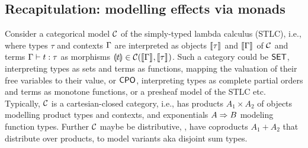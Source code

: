 \documentclass[acmsmall,review,anonymous]{acmart}\settopmatter{printfolios=true,printccs=false,printacmref=false}
\newcommand{\graybox}[1]{\grayboxtext{$#1$}}
\begin{document}
\newcommand{\SubstTy}[4]{#1#2 \vdash #3 : #4}
\newcommand{\pSubstTy}[4]{(#1)#2 \vdash (#3) : (#4)}
\newcommand{\ValTy}[3]{#1 \vdash #2 : #3}
\newcommand{\oCompTy}{\ValTy}
\newcommand{\CompTy}[4]{#1 \vdash #2 : #4 \mid #3}
\newcommand{\gpValTy}[4]{\graybox{(#1)}#2 \vdash #3 : #4}
\newcommand{\gqValTy}[4]{\graybox{#1}#2 \vdash #3 : #4}
\newcommand{\gpCompTy}[4]{\graybox{(#1)}#2 \vdash #3 : #4}
\newcommand{\gqCompTy}[4]{\graybox{#1}#2 \vdash #3 : #4}
\newcommand{\pValTy}[4]{(#1)#2 \vdash #3 : #4}
\newcommand{\qValTy}[4]{#1#2 \vdash #3 : #4}
\newcommand{\pCompTy}[4]{(#1)#2 \vdash #3 : #4}
\newcommand{\qCompTy}[4]{#1#2 \vdash #3 : #4}
\newcommand{\ru}{\dfrac}
\newcommand{\nru}[3]{#1\;\dfrac{#2}{#3}}
\newcommand{\nrux}[4]{#1\;\dfrac{#2}{#3}\;#4}

\newcommand{\rulename}[1]{\ensuremath{\mbox{\textsc{#1}}}\xspace}
\newcommand{\rbeta}[1]{\ensuremath{\beta\mbox{-}\mathord{#1}}\xspace}
\newcommand{\reta}[1]{\ensuremath{\eta\mbox{-}\mathord{#1}}\xspace}
\newcommand{\rpi}[1]{\ensuremath{\pi\mbox{-}\mathord{#1}}\xspace}
\newcommand{\rintro}[1]{\ensuremath{\mathord{#1}\mbox{-\rulename{intro}}}\xspace}
\newcommand{\relim}[1]{\ensuremath{\mathord{#1}\mbox{-\rulename{elim}}}\xspace}
\newcommand{\rvar}{\rulename{var}}
\newcommand{\rlet}{\rulename{let}}
\newcommand{\rsub}{\rulename{sub}}
\newcommand{\rweak}{\rulename{weak}}


\subsection{Recapitulation: modelling effects via monads}
\label{sec:ccc}

Consider a categorical model $\mathcal{C}$ of the simply-typed lambda calculus
(STLC), i.e., where types $\tau$ and contexts $\Gamma$ are interpreted as
objects $\llbracket\tau\rrbracket^{}$ and $\llbracket\Gamma\rrbracket^{}$ of $\mathcal{C}$ and terms
$\Gamma \vdash t : \tau$ as morphisms $\llparenthesis t\rrparenthesis \in \mathcal{C}(\llbracket\Gamma\rrbracket^{},\llbracket\tau\rrbracket^{})$.
Such a category could be $\mathsf{SET}$, interpreting types as sets and terms
as functions, mapping the valuation of their free variables to their
value, or $\mathsf{CPO}$, interpreting types as complete partial orders and
terms as monotone functions, or a presheaf model of the STLC etc.
Typically, $\mathcal{C}$ is a cartesian-closed category, i.e., has products
$A_1 \times A_2$ of objects modelling product types and contexts,
and exponentials $A \Rightarrow
B$ modeling function types.  Further $\mathcal{C}$ maybe be distributive,
\ie, have coproducts $A_1 + A_2$ that distribute over products, to
model variants aka disjoint sum types.
\end{document}
